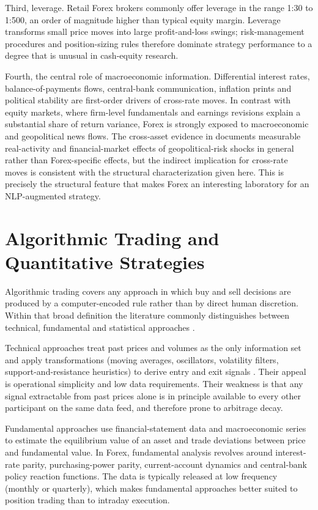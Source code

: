 Third, leverage. Retail Forex brokers commonly offer leverage in the range 1:30 to 1:500, an order of magnitude higher than typical equity margin. Leverage transforms small price moves into large profit-and-loss swings; risk-management procedures and position-sizing rules therefore dominate strategy performance to a degree that is unusual in cash-equity research.

Fourth, the central role of macroeconomic information. Differential interest rates, balance-of-payments flows, central-bank communication, inflation prints and political stability are first-order drivers of cross-rate moves. In contrast with equity markets, where firm-level fundamentals and earnings revisions explain a substantial share of return variance, Forex is strongly exposed to macroeconomic and geopolitical news flows. The cross-asset evidence in  documents measurable real-activity and financial-market effects of geopolitical-risk shocks in general rather than Forex-specific effects, but the indirect implication for cross-rate moves is consistent with the structural characterization given here. This is precisely the structural feature that makes Forex an interesting laboratory for an NLP-augmented strategy.

\section{Algorithmic Trading and Quantitative Strategies} \label{sec:algotrading}

Algorithmic trading covers any approach in which buy and sell decisions are produced by a computer-encoded rule rather than by direct human discretion. Within that broad definition the literature commonly distinguishes between technical, fundamental and statistical approaches \cite{chan2009quantitative,chan2013algorithmic}.

Technical approaches treat past prices and volumes as the only information set and apply transformations (moving averages, oscillators, volatility filters, support-and-resistance heuristics) to derive entry and exit signals \cite{murphy1999technical}. Their appeal is operational simplicity and low data requirements. Their weakness is that any signal extractable from past prices alone is in principle available to every other participant on the same data feed, and therefore prone to arbitrage decay.

Fundamental approaches use financial-statement data and macroeconomic series to estimate the equilibrium value of an asset and trade deviations between price and fundamental value. In Forex, fundamental analysis revolves around interest-rate parity, purchasing-power parity, current-account dynamics and central-bank policy reaction functions. The data is typically released at low frequency (monthly or quarterly), which makes fundamental approaches better suited to position trading than to intraday execution.


